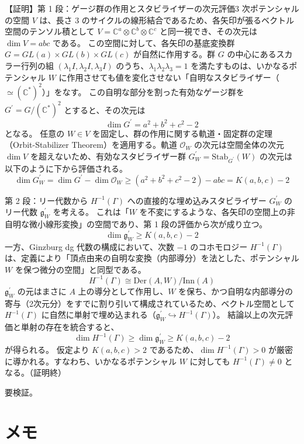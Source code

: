 \documentclass[uplatex,12pt,dvipdfmx]{jsarticle}
\theoremstyle{definition}
\numberwithin{equation}{section}
\begin{document}
\begin{itemize}
\begin{myquote}
		【証明】第 1 段：ゲージ群の作用とスタビライザーの次元評価3 次ポテンシャルの空間 $V$ は、長さ 3 のサイクルの線形結合であるため、各矢印が張るベクトル空間のテンソル積として $V = \mathbb{C}^a \otimes \mathbb{C}^b \otimes \mathbb{C}^c$ と同一視でき、その次元は $\dim V = abc$ である。
		この空間に対して、各矢印の基底変換群 $G = GL(a) \times GL(b) \times GL(c)$ が自然に作用する。群 $G$ の中心にあるスカラー行列の組 $(\lambda_1 I, \lambda_2 I, \lambda_3 I)$ のうち、$\lambda_1 \lambda_2 \lambda_3 = 1$ を満たすものは、いかなるポテンシャル $W$ に作用させても値を変化させない「自明なスタビライザー（$\simeq (\mathbb{C}^*)^2$）」をなす。
		この自明な部分を割った有効なゲージ群を $G^\prime = G / (\mathbb{C}^*)^2$ とすると、その次元は$$ \dim G^\prime = a^2 + b^2 + c^2 - 2 $$となる。
		任意の $W \in V$ を固定し、群の作用に関する軌道・固定群の定理（Orbit-Stabilizer Theorem）を適用する。軌道 $\mathcal{O}_W$ の次元は空間全体の次元 $\dim V$ を超えないため、有効なスタビライザー群 $G^\prime_W = \mathrm{Stab}_{G^\prime}(W)$ の次元は以下のように下から評価される。
$$ \dim G^\prime_W = \dim G^\prime - \dim \mathcal{O}_W \ge (a^2 + b^2 + c^2 - 2) - abc = K(a, b, c) - 2 $$

		第 2 段：リー代数から $H^{-1}(\Gamma)$ への直接的な埋め込みスタビライザー $G^\prime_W$ のリー代数 $\mathfrak{g}^\prime_W$ を考える。
		これは「$W$ を不変にするような、各矢印の空間上の非自明な微小線形変換」の空間であり、第 1 段の評価から次が成り立つ。
$$ \dim \mathfrak{g}^\prime_W \ge K(a, b, c) - 2 $$
		一方、Ginzburg dg 代数の構成において、次数 $-1$ のコホモロジー $H^{-1}(\Gamma)$ は、定義により「頂点由来の自明な変換（内部導分）を法とした、ポテンシャル $W$ を保つ微分の空間」と同型である。
$$ H^{-1}(\Gamma) \cong \mathrm{Der}(A, W) / \mathrm{Inn}(A) $$
		$\mathfrak{g}^\prime_W$ の元はまさに $A$ 上の導分として作用し、$W$ を保ち、かつ自明な内部導分の寄与（2次元分）をすでに割り引いて構成されているため、ベクトル空間として $H^{-1}(\Gamma)$ に自然に単射で埋め込まれる（$\mathfrak{g}^\prime_W \hookrightarrow H^{-1}(\Gamma)$）。
		結論以上の次元評価と単射の存在を統合すると、$$ \dim H^{-1}(\Gamma) \ge \dim \mathfrak{g}^\prime_W \ge K(a, b, c) - 2 $$が得られる。
		仮定より $K(a, b, c) > 2$ であるため、$\dim H^{-1}(\Gamma) > 0$ が厳密に導かれる。すなわち、いかなるポテンシャル $W$ に対しても $H^{-1}(\Gamma) \neq 0$ となる。（証明終）
	\end{myquote}
	要検証。
\end{itemize}



\section{メモ}
\end{document}
